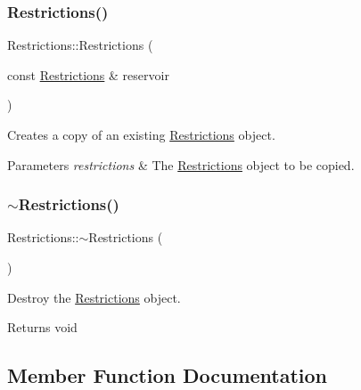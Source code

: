 \subsubsection{\texorpdfstring{Restrictions()}{Restrictions()}\hspace{0.1cm}{\footnotesize\ttfamily [3/3]}}
{\footnotesize\ttfamily Restrictions\+::\+Restrictions (\begin{DoxyParamCaption}\item[{const \mbox{\hyperlink{classRestrictions}{Restrictions}} \&}]{reservoir }\end{DoxyParamCaption})}



Creates a copy of an existing \mbox{\hyperlink{classRestrictions}{Restrictions}} object. 


\begin{DoxyParams}{Parameters}
{\em restrictions} & The \mbox{\hyperlink{classRestrictions}{Restrictions}} object to be copied. \\
\hline
\end{DoxyParams}
\mbox{\label{classRestrictions_a54c8a857a2beed78d34a46c36951b004}} 
\subsubsection{\texorpdfstring{$\sim$\+Restrictions()}{~Restrictions()}}
{\footnotesize\ttfamily Restrictions\+::$\sim$\+Restrictions (\begin{DoxyParamCaption}{ }\end{DoxyParamCaption})}



Destroy the \mbox{\hyperlink{classRestrictions}{Restrictions}} object. 

\begin{DoxyReturn}{Returns}
void 
\end{DoxyReturn}


\subsection{Member Function Documentation}
\mbox{\label{classRestrictions_ab0a2b62495d6cdd8d1fedba419c05c37}} 
